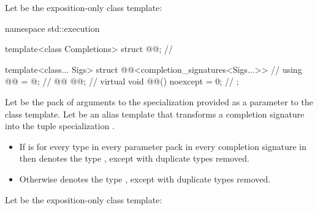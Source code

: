 \pnum
Let  be the exposition-only class template:

%
\begin{codeblock}
namespace std::execution {
  template<class Completions>
  struct @@;                                   // \expos

  template<class... Sigs>
  struct @@<completion_signatures<Sigs...>> {  // \expos
    using @@ = @\seebelow@;                                    // \expos
    @@ @@;                                               // \expos
    virtual void @@() noexcept = 0;                           // \expos
  };
}
\end{codeblock}

\pnum
Let  be the pack of arguments to
the  specialization provided as
a parameter to the  class template.
Let  be an alias template that
transforms a completion signature 
into the tuple specialization .

\begin{itemize}
\item
If  is 
for every type 
in every parameter pack 
in every completion signature 
in  then
 denotes the type
,
except with duplicate types removed.

\item
Otherwise
 denotes the type
,
except with duplicate types removed.
\end{itemize}

\pnum
Let  be the exposition-only class template:

